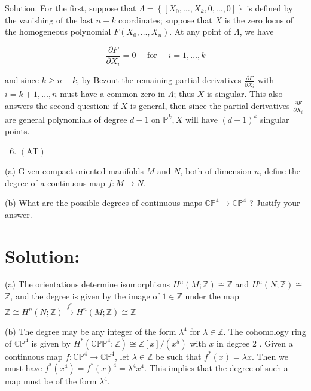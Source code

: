 \documentclass[10pt]{article}
\begin{document}
Solution. For the first, suppose that $\Lambda=\left\{\left[X_{0}, \ldots, X_{k}, 0, \ldots, 0\right]\right\}$ is defined by the vanishing of the last $n-k$ coordinates; suppose that $X$ is the zero locus of the homogeneous polynomial $F\left(X_{0}, \ldots, X_{n}\right)$. At any point of $\Lambda$, we have

$$
\frac{\partial F}{\partial X_{i}}=0 \quad \text { for } \quad i=1, \ldots, k
$$

and since $k \geq n-k$, by Bezout the remaining partial derivatives $\frac{\partial F}{\partial X_{i}}$ with $i=k+1, \ldots, n$ must have a common zero in $\Lambda$; thus $X$ is singular. This also answers the second question: if $X$ is general, then since the partial derivatives $\frac{\partial F}{\partial X_{i}}$ are general polynomials of degree $d-1$ on $\mathbb{P}^{k}, X$ will have $(d-1)^{k}$ singular points.

\begin{enumerate}
  \setcounter{enumi}{5}
  \item $(\mathrm{AT})$
\end{enumerate}

(a) Given compact oriented manifolds $M$ and $N$, both of dimension $n$, define the degree of a continuous map $f: M \rightarrow N$.

(b) What are the possible degrees of continuous maps $\mathbb{C P}^{4} \rightarrow \mathbb{C P}^{4}$ ? Justify your answer.

\section{Solution:}
(a) The orientations determine isomorphisms $H^{n}(M ; \mathbb{Z}) \cong \mathbb{Z}$ and $H^{n}(N ; \mathbb{Z}) \cong$ $\mathbb{Z}$, and the degree is given by the image of $1 \in \mathbb{Z}$ under the map $\mathbb{Z} \cong H^{n}(N ; \mathbb{Z}) \stackrel{f^{*}}{\longrightarrow} H^{n}(M ; \mathbb{Z}) \cong \mathbb{Z}$

(b) The degree may be any integer of the form $\lambda^{4}$ for $\lambda \in \mathbb{Z}$. The cohomology ring of $\mathbb{C P}^{4}$ is given by $H^{*}\left(\mathbb{C P} \mathbb{P}^{4} ; \mathbb{Z}\right) \cong \mathbb{Z}[x] /\left(x^{5}\right)$ with $x$ in degree 2 . Given a continuous map $f: \mathbb{C P}^{4} \rightarrow \mathbb{C P}^{4}$, let $\lambda \in \mathbb{Z}$ be such that $f^{*}(x)=\lambda x$. Then we must have $f^{*}\left(x^{4}\right)=f^{*}(x)^{4}=\lambda^{4} x^{4}$. This implies that the degree of such a map must be of the form $\lambda^{4}$.
\end{document}
